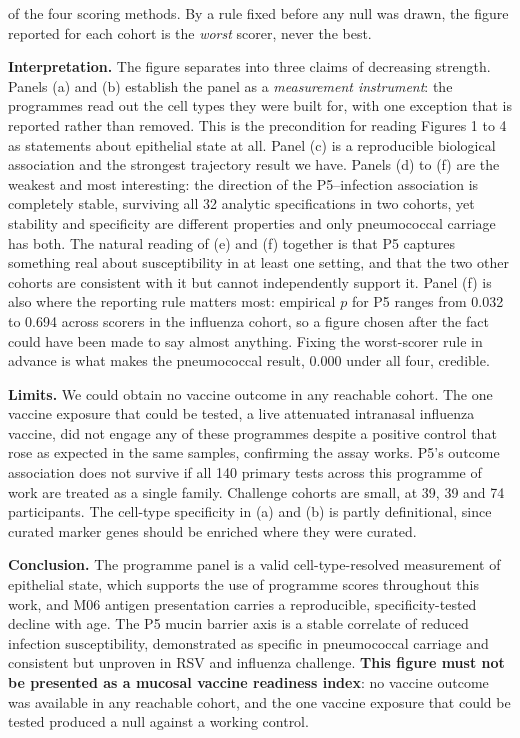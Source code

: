 \documentclass[11pt,a4paper]{article}
\begin{document}
{of the four scoring methods. By a rule fixed before any null was drawn, the figure reported
for each cohort is the \emph{worst} scorer, never the best.
\par
\textbf{Interpretation.} The figure separates into three claims of decreasing strength.
Panels (a) and (b) establish the panel as a \emph{measurement instrument}: the programmes
read out the cell types they were built for, with one exception that is reported rather than
removed. This is the precondition for reading Figures 1 to 4 as statements about epithelial
state at all. Panel (c) is a reproducible biological association and the strongest trajectory
result we have. Panels (d) to (f) are the weakest and most interesting: the direction of the
P5--infection association is completely stable, surviving all 32 analytic specifications in
two cohorts, yet stability and specificity are different properties and only pneumococcal
carriage has both. The natural reading of (e) and (f) together is that P5 captures something
real about susceptibility in at least one setting, and that the two other cohorts are
consistent with it but cannot independently support it. Panel (f) is also where the reporting
rule matters most: empirical $p$ for P5 ranges from 0.032 to 0.694 across scorers in the
influenza cohort, so a figure chosen after the fact could have been made to say almost
anything. Fixing the worst-scorer rule in advance is what makes the pneumococcal result,
0.000 under all four, credible.
\par
\textbf{Limits.} We could obtain no vaccine outcome in any reachable cohort. The one vaccine
exposure that could be tested, a live attenuated intranasal influenza vaccine, did not engage
any of these programmes despite a positive control that rose as expected in the same samples,
confirming the assay works. P5's outcome association does not survive if all 140 primary
tests across this programme of work are treated as a single family. Challenge cohorts are
small, at 39, 39 and 74 participants. The cell-type specificity in (a) and (b) is partly
definitional, since curated marker genes should be enriched where they were curated.
\par
\textbf{Conclusion.} The programme panel is a valid cell-type-resolved measurement of
epithelial state, which supports the use of programme scores throughout this work, and M06
antigen presentation carries a reproducible, specificity-tested decline with age. The P5
mucin barrier axis is a stable correlate of reduced infection susceptibility, demonstrated as
specific in pneumococcal carriage and consistent but unproven in RSV and influenza challenge.
\textbf{This figure must not be presented as a mucosal vaccine readiness index}: no vaccine
outcome was available in any reachable cohort, and the one vaccine exposure that could be
tested produced a null against a working control.}
\end{document}
